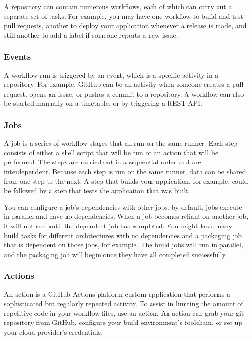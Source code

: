 A repository can contain numerous workflows, each of which can carry out a separate set of tasks. For example, you may have one workflow to build and test pull requests, another to deploy your application whenever a release is made, and still another to add a label if someone reports a new issue.

\subsubsection{Events}
A workflow run is triggered by an event, which is a specific activity in a repository. For example, GitHub can be an activity when someone creates a pull request, opens an issue, or pushes a commit to a repository. A workflow can also be started manually on a timetable, or by triggering a REST API.

\subsubsection{Jobs}
A job is a series of workflow stages that all run on the same runner. Each step consists of either a shell script that will be run or an action that will be performed. The steps are carried out in a sequential order and are interdependent. Because each step is run on the same runner, data can be shared from one step to the next. A step that builds your application, for example, could be followed by a step that tests the application that was built.

You can configure a job's dependencies with other jobs; by default, jobs execute in parallel and have no dependencies. When a job becomes reliant on another job, it will not run until the dependent job has completed. You might have many build tasks for different architectures with no dependencies and a packaging job that is dependent on those jobs, for example. The build jobs will run in parallel, and the packaging job will begin once they have all completed successfully.

\subsubsection{Actions}
An action is a GitHub Actions platform custom application that performs a sophisticated but regularly repeated activity. To assist in limiting the amount of repetitive code in your workflow files, use an action. An action can grab your git repository from GitHub, configure your build environment's toolchain, or set up your cloud provider's credentials.

